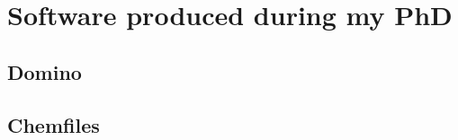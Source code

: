 \documentclass[thesis]{subfiles}
\begin{document}
\chapter{Software produced during my PhD}

\section{Domino}

\section{Chemfiles}
\end{document}
